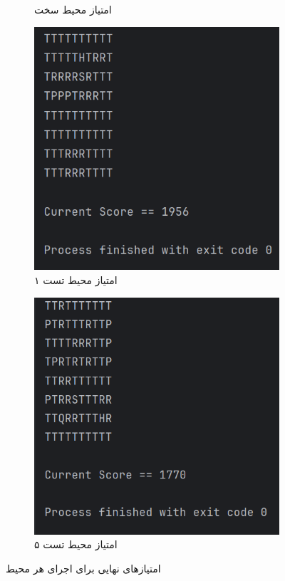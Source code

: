 \documentclass[11pt, a4paper, oneside]{article}
\begin{document}
\begin{figure}[H]
\begin{subfigure}{0.24\textwidth}
	  		\caption{امتیاز محیط سخت}
	  		\label{fig:f}
	  	\end{subfigure}
	  	\hspace{0.5em}
	  	\begin{subfigure}{0.24\textwidth}
	  		\includegraphics[width=\textwidth]{./images/score_t1}
	  		\caption{امتیاز محیط تست ۱}
	  		\label{fig:g}
	  	\end{subfigure}
	  	\hspace{0.5em}
	  	\begin{subfigure}{0.24\textwidth}
	  		\includegraphics[width=\textwidth]{./images/score_t5}
	  		\caption{امتیاز محیط تست ۵}
	  		\label{fig:h}
	  	\end{subfigure}
	  	\caption{امتیازهای نهایی برای اجرای هر محیط}
	  	\label{scores}
	  \end{figure}
	  
\end{document}
